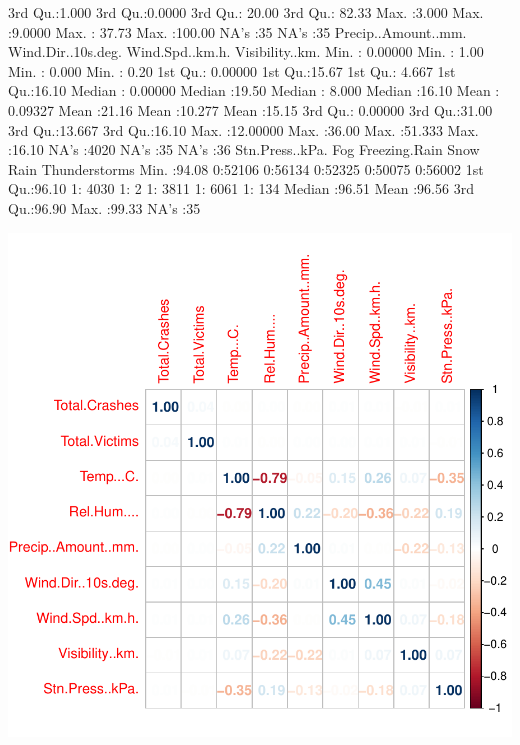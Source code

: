 \documentclass[11pt, a4paper]{article}
\begin{document}
\begin{Schunk}
\begin{Soutput}
 3rd Qu.:1.000   3rd Qu.:0.0000   3rd Qu.: 20.00   3rd Qu.: 82.33  
 Max.   :3.000   Max.   :9.0000   Max.   : 37.73   Max.   :100.00  
                                  NA's   :35       NA's   :35      
 Precip..Amount..mm. Wind.Dir..10s.deg. Wind.Spd..km.h.  Visibility..km.
 Min.   : 0.00000    Min.   : 1.00      Min.   : 0.000   Min.   : 0.20  
 1st Qu.: 0.00000    1st Qu.:15.67      1st Qu.: 4.667   1st Qu.:16.10  
 Median : 0.00000    Median :19.50      Median : 8.000   Median :16.10  
 Mean   : 0.09327    Mean   :21.16      Mean   :10.277   Mean   :15.15  
 3rd Qu.: 0.00000    3rd Qu.:31.00      3rd Qu.:13.667   3rd Qu.:16.10  
 Max.   :12.00000    Max.   :36.00      Max.   :51.333   Max.   :16.10  
                     NA's   :4020       NA's   :35       NA's   :36     
 Stn.Press..kPa. Fog       Freezing.Rain Snow      Rain      Thunderstorms
 Min.   :94.08   0:52106   0:56134       0:52325   0:50075   0:56002      
 1st Qu.:96.10   1: 4030   1:    2       1: 3811   1: 6061   1:  134      
 Median :96.51                                                            
 Mean   :96.56                                                            
 3rd Qu.:96.90                                                            
 Max.   :99.33                                                            
 NA's   :35                                                               
\end{Soutput}
\end{Schunk}
\includegraphics{variableinvestigation-ss}
\end{document}
